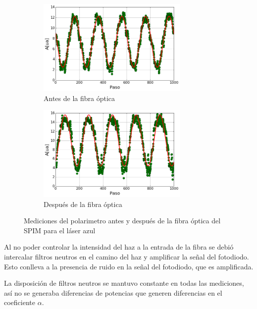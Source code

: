 \begin{figure}[H]
    \begin{subfigure}[b]{0.5\textwidth}
        \centering
        \includegraphics[width=0.8\textwidth]{fig/polarimetro/polarizacion_laser}
        \caption{Antes de la fibra óptica}
        \label{fig:polarimetro/polarizacion_laser}
    \end{subfigure}
    \begin{subfigure}[b]{0.5\textwidth}
        \centering
        \includegraphics[width=0.8\textwidth]{fig/polarimetro/polarizacion_fibra}
        \caption{Después de la fibra óptica}
        \label{fig:polarimetro/polarizacion_fibra}
    \end{subfigure}
    \caption{Mediciones del polarimetro antes y después de la fibra óptica del SPIM para el láser azul}
\end{figure}

Al no poder controlar la intensidad del haz a la entrada de la fibra se debió intercalar filtros neutros en el camino del haz y amplificar la señal del fotodiodo. Esto conlleva a la presencia de ruido en la señal del fotodiodo, que es amplificada. 

La disposición de filtros neutros se mantuvo constante en todas las mediciones, así no se generaba diferencias de potencias que generen diferencias en el coeficiente $\alpha$. 


